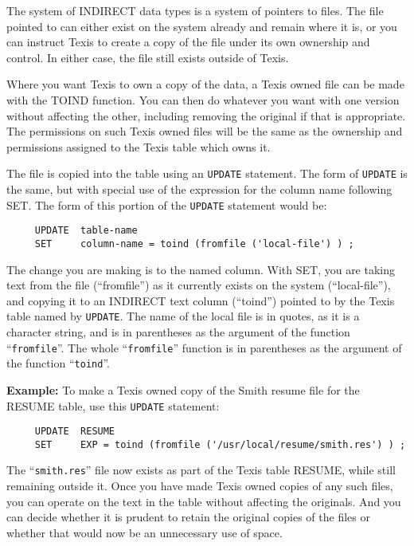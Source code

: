The system of INDIRECT data types is a system of pointers to files.
The file pointed to can either exist on the system already and remain
where it is, or you can instruct Texis to create a copy of the file
under its own ownership and control.  In either case, the file still
exists outside of Texis.

Where you want Texis to own a copy of the data, a Texis owned file can
be made with the TOIND function.  You can then do whatever you want
with one version without affecting the other, including removing the
original if that is appropriate.  The permissions on such Texis owned
files will be the same as the ownership and permissions assigned to
the Texis table which owns it.

The file is copied into the table using an \verb`UPDATE` statement.  The form
of \verb`UPDATE` is the same, but with special use of the expression for the
column name following SET.  The form of this portion of the \verb`UPDATE`
statement would be:

\begin{verbatim}
     UPDATE  table-name
     SET     column-name = toind (fromfile ('local-file') ) ;
\end{verbatim}

The change you are making is to the named column.  With SET, you are
taking text from the file (``fromfile'') as it currently exists on the
system (``local-file''), and copying it to an INDIRECT text column
(``toind'') pointed to by the Texis table named by \verb`UPDATE`.  The name
of the local file is in quotes, as it is a character string, and is in
parentheses as the argument of the function ``\verb`fromfile`''.  The
whole ``\verb`fromfile`'' function is in parentheses as the argument
of the function ``\verb`toind`''.

{\bf Example:}
To make a Texis owned copy of the Smith resume file for the RESUME
table, use this \verb`UPDATE` statement:

\begin{verbatim}
     UPDATE  RESUME
     SET     EXP = toind (fromfile ('/usr/local/resume/smith.res') ) ;
\end{verbatim}

The ``\verb`smith.res`'' file now exists as part of the Texis table
RESUME, while still remaining outside it.  Once you have made Texis owned
copies of any such files, you can operate on the text in the table without
affecting the originals.  And you can decide whether it is prudent to
retain the original copies of the files or whether that would now be an
unnecessary use of space.


